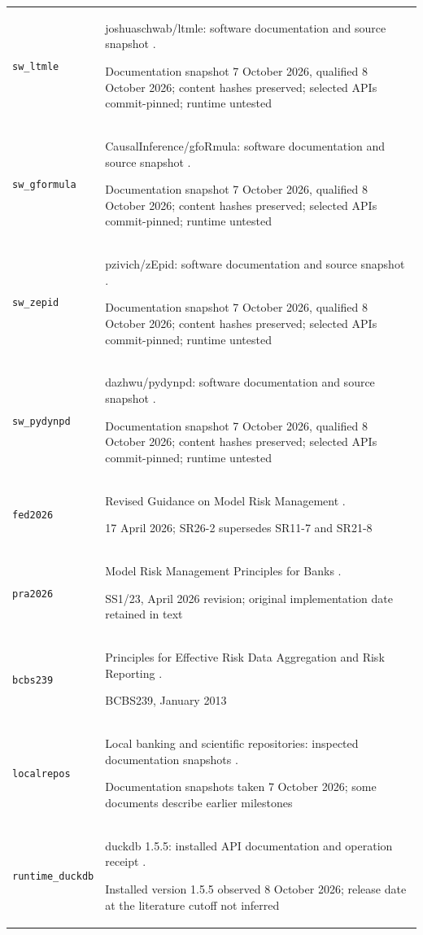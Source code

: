 \begin{longtable}{P{32mm}P{112mm}}
{\scriptsize\texttt{sw\_ltmle}} & joshuaschwab/ltmle: software documentation and source snapshot \citep{sw_ltmle}.\par Documentation snapshot 7 October 2026, qualified 8 October 2026; content hashes preserved; selected APIs commit-pinned; runtime untested\\
{\scriptsize\texttt{sw\_gformula}} & CausalInference/gfoRmula: software documentation and source snapshot \citep{sw_gformula}.\par Documentation snapshot 7 October 2026, qualified 8 October 2026; content hashes preserved; selected APIs commit-pinned; runtime untested\\
{\scriptsize\texttt{sw\_zepid}} & pzivich/zEpid: software documentation and source snapshot \citep{sw_zepid}.\par Documentation snapshot 7 October 2026, qualified 8 October 2026; content hashes preserved; selected APIs commit-pinned; runtime untested\\
{\scriptsize\texttt{sw\_pydynpd}} & dazhwu/pydynpd: software documentation and source snapshot \citep{sw_pydynpd}.\par Documentation snapshot 7 October 2026, qualified 8 October 2026; content hashes preserved; selected APIs commit-pinned; runtime untested\\
{\scriptsize\texttt{fed2026}} & Revised Guidance on Model Risk Management \citep{fed2026}.\par 17 April 2026; SR26-2 supersedes SR11-7 and SR21-8\\
{\scriptsize\texttt{pra2026}} & Model Risk Management Principles for Banks \citep{pra2026}.\par SS1/23, April 2026 revision; original implementation date retained in text\\
{\scriptsize\texttt{bcbs239}} & Principles for Effective Risk Data Aggregation and Risk Reporting \citep{bcbs239}.\par BCBS239, January 2013\\
{\scriptsize\texttt{localrepos}} & Local banking and scientific repositories: inspected documentation snapshots \citep{localrepos}.\par Documentation snapshots taken 7 October 2026; some documents describe earlier milestones\\
{\scriptsize\texttt{runtime\_duckdb}} & duckdb 1.5.5: installed API documentation and operation receipt \citep{runtime_duckdb}.\par Installed version 1.5.5 observed 8 October 2026; release date at the literature cutoff not inferred\\

\end{longtable}
